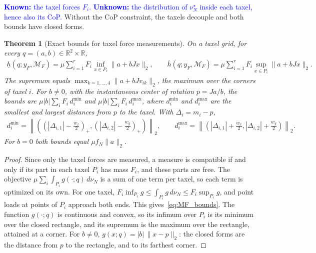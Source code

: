 \documentclass[11pt,a4paper]{article}
\theoremstyle{plain}
\newtheorem{theorem}{Theorem}[section]
\newcommand{\R}{\mathbb{R}}
\begin{document}
\textcolor{blue}{\textbf{Known:} the taxel forces $F_i$. \textbf{Unknown:} the distribution of $\nu_N^\star$ inside each taxel, hence also its CoP.}
Without the CoP constraint, the taxels decouple and both bounds have closed forms.

\begin{theorem}[Exact bounds for taxel force measurements]
\label{thm:MF}
    On a taxel grid, for every $q=(a,b)\in\R^2\times\R$,
    \begin{align}
        \label{eq:MF_bounds}
        \boxed{
        \underline h(q;y_F,\mathcal M_F)=\mu\sum_{i=1}^rF_i\inf_{x\in P_i}\|a+bJx\|_2,
        \qquad
        \overline h(q;y_F,\mathcal M_F)=\mu\sum_{i=1}^rF_i\sup_{x\in P_i}\|a+bJx\|_2.}
    \end{align}
    The supremum equals $\max_{k=1,\ldots,4}\|a+bJv_{ik}\|_2$, the maximum over the corners of taxel $i$. For $b\neq0$, with the instantaneous center of rotation $p=Ja/b$,
    the bounds are $\mu|b|\sum_iF_i\,d_i^{\min}$ and $\mu|b|\sum_iF_i\,d_i^{\max}$, where $d_i^{\min}$ and $d_i^{\max}$ are the smallest and largest distances from $p$ to the taxel.
    With $\Delta_i=m_i-p$,
    \begin{align}
        \label{eq:MF_rectangle}
        d_i^{\min}=\left\|\left(\left(|\Delta_{i,1}|-\tfrac{w_x}{2}\right)_+,\left(|\Delta_{i,2}|-\tfrac{w_y}{2}\right)_+\right)\right\|_2,
        \qquad
        d_i^{\max}=\left\|\left(|\Delta_{i,1}|+\tfrac{w_x}{2},|\Delta_{i,2}|+\tfrac{w_y}{2}\right)\right\|_2.
    \end{align}
    For $b=0$ both bounds equal $\mu f_N\|a\|_2$.
\end{theorem}
\begin{proof}
    Since only the taxel forces are measured, a measure is compatible if and only if its part in each taxel $P_i$ has mass $F_i$, and these parts are free. The objective
    $\mu\sum_i\int_{P_i}g(\cdot;q)\,d\nu_N$ is a sum of one term per taxel, so each term is optimized on its own.
    For one taxel, $F_i\inf_{P_i}g\le\int_{P_i}g\,d\nu_N\le F_i\sup_{P_i}g$, and point loads at points of $P_i$ approach both ends. This gives~\eqref{eq:MF_bounds}.
    The function $g(\cdot;q)$ is continuous and convex, so its infimum over $P_i$ is its minimum over the closed rectangle, and its supremum is the maximum over the rectangle, attained at a corner.
    For $b\neq0$, $g(x;q)=|b|\,\|x-p\|_2$: the closed forms are the distance from $p$ to the rectangle, and to its farthest corner.
\end{proof}
\end{document}
